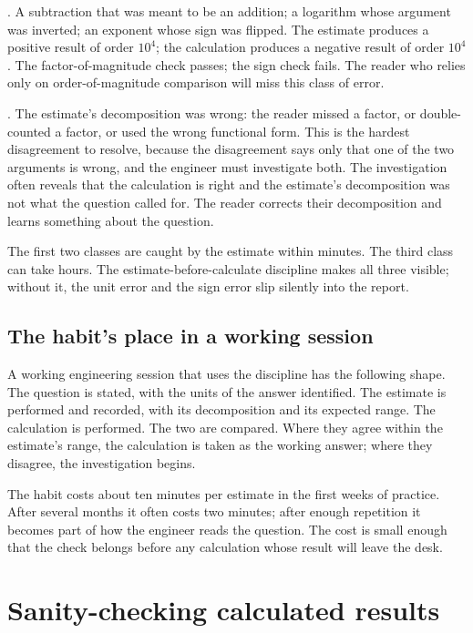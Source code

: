 . A subtraction that was meant to be an addition;
a logarithm whose argument was inverted; an exponent whose sign was
flipped. The estimate produces a positive result of order $10^{4}$;
the calculation produces a negative result of order $10^{4}$. The
factor-of-magnitude check passes; the sign check fails. The reader
who relies only on order-of-magnitude comparison will miss this
class of error.

. The estimate's decomposition was wrong:
the reader missed a factor, or double-counted a factor, or used the
wrong functional form. This is the hardest disagreement to resolve,
because the disagreement says only that one of the two arguments is
wrong, and the engineer must investigate both. The investigation often
reveals that the calculation is right and the estimate's decomposition
was not what the question called for. The reader corrects their
decomposition and learns something about the question.

The first two classes are caught by the estimate within minutes. The
third class can take hours. The estimate-before-calculate discipline
makes all three visible; without it, the unit error and the sign error
slip silently into the report.

\subsection{The habit's place in a working session}

A working engineering session that uses the discipline has the
following shape. The question is stated, with the units of the answer
identified. The estimate is performed and recorded, with its
decomposition and its expected range. The calculation is performed.
The two are compared. Where they agree within the estimate's range,
the calculation is taken as the working answer; where they disagree,
the investigation begins.

The habit costs about ten minutes per estimate in the first weeks of
practice. After several months it often costs two minutes; after
enough repetition it becomes part of how the engineer reads the
question. The cost is small enough that the check belongs before any
calculation whose result will leave the desk.

\section{Sanity-checking calculated results}

